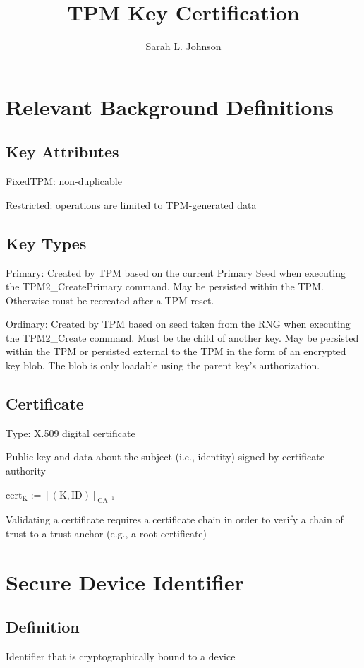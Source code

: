 \documentclass{article}
\title{TPM Key Certification}
\author{Sarah L. Johnson}
\begin{document}
\maketitle

\section*{Relevant Background Definitions}
\subsection*{Key Attributes}
FixedTPM: non-duplicable 

Restricted: operations are limited to TPM-generated data

\subsection*{Key Types}
Primary: Created by TPM based on the current Primary Seed when executing the TPM2\_CreatePrimary command. May be persisted within the TPM. Otherwise must be recreated after a TPM reset.

Ordinary: Created by TPM based on seed taken from the RNG when executing the TPM2\_Create command. Must be the child of another key. May be persisted within the TPM or persisted external to the TPM in the form of an encrypted key blob. The blob is only loadable using the parent key's authorization.

\subsection*{Certificate}
Type: X.509 digital certificate

Public key and data about the subject (i.e., identity) signed by certificate authority

$\text{cert}_{\text{K}} := [(\text{K}, \text{ID})]_{\text{CA}^{-1}}$

Validating a certificate requires a certificate chain in order to verify a chain of trust to a trust anchor (e.g., a root certificate)







\section*{Secure Device Identifier}
\subsection*{Definition}
Identifier that is cryptographically bound to a device
\end{document}
